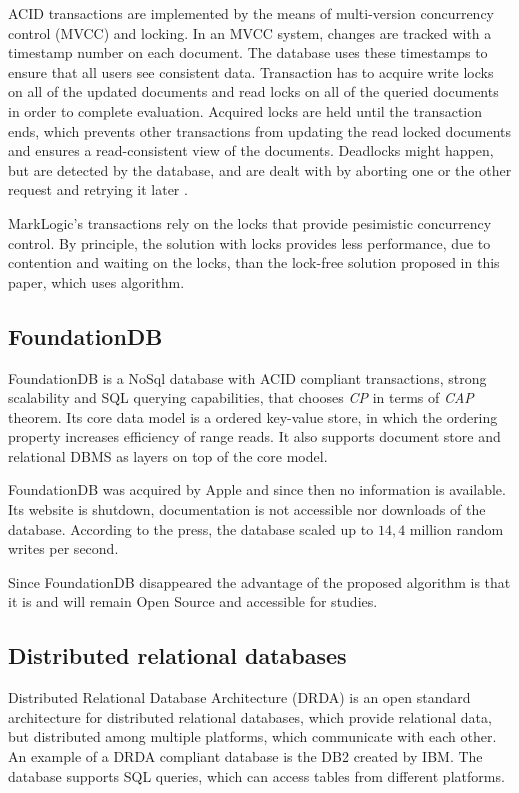 ACID transactions are implemented by the means of multi-version concurrency control (MVCC) and locking. In an MVCC system, changes are tracked with a timestamp number on each document. 
The database uses these timestamps to ensure that all users see consistent data. 
Transaction has to acquire write locks on all of the updated documents and read locks on all of the queried documents in order to complete evaluation. Acquired locks are held until the transaction ends, which prevents other transactions from updating the read locked documents and ensures a read-consistent view of the documents. 
Deadlocks might happen, but are detected by the database, and are dealt with by aborting one or the other request and retrying it later \cite{markLogicUnderstandingTransactions}.

MarkLogic's transactions rely on the locks that provide pesimistic concurrency control.
By principle, the solution with locks provides less performance, due to contention and waiting on the locks, than the lock-free solution proposed in this paper, which uses \paxos algorithm.


\subsection{FoundationDB}
FoundationDB is a NoSql database with ACID compliant transactions, strong scalability and SQL querying capabilities, that chooses \emph{CP} in terms of \emph{CAP} theorem.
Its core data model is a ordered key-value store, in which the ordering property increases efficiency of range reads. It also supports document store and relational DBMS as layers on top of the core model. 

FoundationDB was acquired by Apple \cite{foundationDbAcquired} and since then no information is available. Its website is shutdown, documentation is not accessible nor downloads of the database. According to the press, the database scaled up to $14,4$ million random writes per second.

Since FoundationDB disappeared the advantage of the proposed algorithm is that it is and will remain Open Source and accessible for studies.

\subsection{Distributed relational databases}
Distributed Relational Database Architecture (DRDA) \cite{drda} is an open standard architecture for distributed relational databases, which provide relational data, but distributed among multiple platforms, which communicate with each other. An example of a DRDA compliant database is the DB2 created by IBM. The database supports SQL queries, which can access tables from different platforms. 

